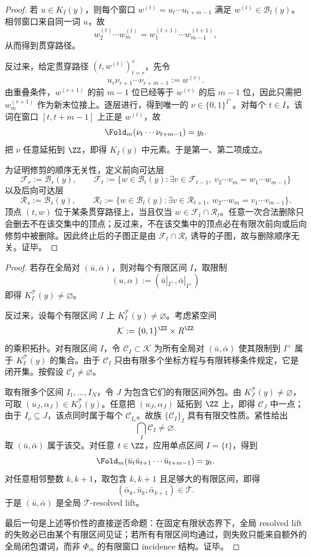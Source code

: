 \begin{proof}
若 \(u\in K_I(y)\)，则每个窗口 \(w^{(t)}=u_t\cdots u_{t+m-1}\) 满足 \(w^{(t)}\in\mathcal B_t(y)\)。相邻窗口来自同一词 \(u\)，故
\[
w^{(t)}_2\cdots w^{(t)}_m=w^{(t+1)}_1\cdots w^{(t+1)}_{m-1},
\]
从而得到贯穿路径。

反过来，给定贯穿路径 \((t,w^{(t)})_{t=r}^s\)，先令
\[
u_r\nu_{r+1}\cdots\nu_{r+m-1}:=w^{(r)}.
\]
由重叠条件，\(w^{(r+1)}\) 的前 \(m-1\) 位已经等于 \(w^{(r)}\) 的后 \(m-1\) 位，因此只需把 \(w^{(r+1)}_m\) 作为新末位接上。逐层进行，得到唯一的 \(\nu\in\{0,1\}^{I^+}\)。对每个 \(t\in I\)，该词在窗口 \([t,t+m-1]\) 上正是 \(w^{(t)}\)，故
\[
\Fold_m(\nu_t\cdots\nu_{t+m-1})=y_t.
\]
把 \(\nu\) 任意延拓到 \(\ZZ\)，即得 \(K_I(y)\) 中元素。于是第一、第二项成立。

为证明修剪的顺序无关性，定义前向可达层
\[
\mathcal F_r:=\mathcal B_r(y),\qquad
\mathcal F_t:=\{w\in\mathcal B_t(y):\exists v\in\mathcal F_{t-1},\ v_2\cdots v_m=w_1\cdots w_{m-1}\}
\]
以及后向可达层
\[
\mathcal R_s:=\mathcal B_s(y),\qquad
\mathcal R_t:=\{w\in\mathcal B_t(y):\exists v\in\mathcal R_{t+1},\ w_2\cdots w_m=v_1\cdots v_{m-1}\}.
\]
顶点 \((t,w)\) 位于某条贯穿路径上，当且仅当 \(w\in\mathcal F_t\cap\mathcal R_t\)。任意一次合法删除只会删去不在该交集中的顶点；反过来，不在该交集中的顶点必在有限次前向或后向修剪中被删除。因此终止后的子图正是由 \(\mathcal F_t\cap\mathcal R_t\) 诱导的子图，故与删除顺序无关。证毕。
\end{proof}

\begin{proof}
若存在全局对 \((\bar u,\bar\alpha)\)，则对每个有限区间 \(I\)，取限制
\[
(u,\alpha):=(\bar u|_{I^+},\bar\alpha|_{I^+})
\]
即得 \(K_I^{\mathcal T}(y)\ne\varnothing\)。

反过来，设每个有限区间 \(I\) 上 \(K_I^{\mathcal T}(y)\ne\varnothing\)。考虑紧空间
\[
\mathcal K:=\{0,1\}^{\ZZ}\times R^{\ZZ}
\]
的乘积拓扑。对有限区间 \(I\)，令 \(\mathcal C_I\subset\mathcal K\) 为所有全局对 \((\bar u,\bar\alpha)\) 使其限制到 \(I^+\) 属于 \(K_I^{\mathcal T}(y)\) 的集合。由于 \(\mathcal C_I\) 只由有限多个坐标方程与有限转移条件规定，它是闭开集。按假设 \(\mathcal C_I\ne\varnothing\)。

取有限多个区间 \(I_1,\ldots,I_N\)，令 \(J\) 为包含它们的有限区间外包。由 \(K_J^{\mathcal T}(y)\ne\varnothing\)，可取 \((u_J,
\alpha_J)\in K_J^{\mathcal T}(y)\)。任意把 \((u_J,\alpha_J)
\) 延拓到 \(\ZZ\) 上，即得 \(\mathcal C_J\) 中一点；由于 \(I_\nu\subseteq J\)，该点同时属于每个 \(\mathcal C_{I_\nu}\)。故族 \(\{\mathcal C_I\}_I\) 具有有限交性质。紧性给出
\[
\bigcap_I\mathcal C_I\ne\varnothing.
\]
取 \((\bar u,\bar\alpha)
\) 属于该交。对任意 \(t\in\ZZ\)，应用单点区间 \(I=\{t\}\)，得到
\[
\Fold_m(\bar u_t\bar u_{t+1}\cdots\bar u_{t+m-1})=y_t.
\]
对任意相邻整数 \(k,k+1\)，取包含 \(k,k+1\) 且足够大的有限区间，即得
\[
(\bar\alpha_k,
\bar u_k,
\bar\alpha_{k+1})\in\mathcal T.
\]
于是 \((\bar u,\bar\alpha)
\) 是全局 \(\mathcal T\)-resolved lift。

最后一句是上述等价性的直接逆否命题：在固定有限状态界下，全局 resolved lift 的失败必已由某个有限区间见证；若所有有限区间均通过，则失败只能来自额外的全局闭包谓词，而非 \(\Phi_m\) 的有限窗口 incidence 结构。证毕。
\end{proof}

